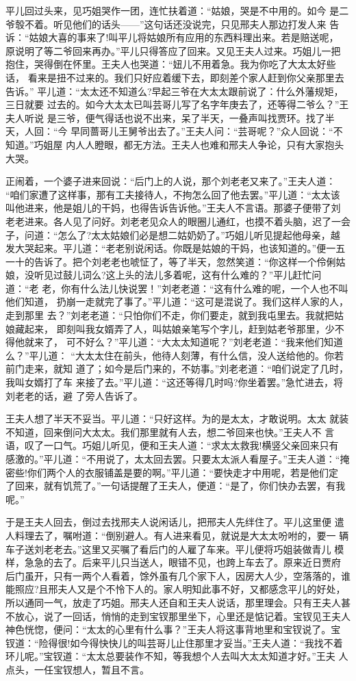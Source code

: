 平儿回过头来，见巧姐哭作一团，连忙扶着道：“姑娘，哭是不中用的。如今
是二爷彀不着。听见他们的话头——”这句话还没说完，只见邢夫人那边打发人来
告诉：“姑娘大喜的事来了!叫平儿将姑娘所有应用的东西料理出来。若是赔送呢，
原说明了等二爷回来再办。”平儿只得答应了回来。又见王夫人过来。巧姐儿一把
抱住，哭得倒在怀里。王夫人也哭道：“妞儿不用着急。我为你吃了大太太好些话，
看来是扭不过来的。我们只好应着缓下去，即刻差个家人赶到你父亲那里去告诉。”
平儿道：“太太还不知道么?早起三爷在大太太跟前说了：什么外藩规矩，三日就要
过去的。如今大太太已叫芸哥儿写了名字年庚去了，还等得二爷么？”王夫人听说
是三爷，便气得话也说不出来，呆了半天，一叠声叫找贾环。找了半天，人回：“今
早同蔷哥儿王舅爷出去了。”王夫人问：“芸哥呢？”众人回说：“不知道。”巧姐屋
内人人瞪眼，都无方法。王夫人也难和邢夫人争论，只有大家抱头大哭。

正闹着，一个婆子进来回说：“后门上的人说，那个刘老老又来了。”王夫人道：
“咱们家遭了这样事，那有工夫接待人，不拘怎么回了他去罢。”平儿道：“太太该
叫他进来，他是姐儿的干妈，也得告诉告诉他。”王夫人不言语。那婆子便带了刘
老老进来。各人见了问好。刘老老见众人的眼圈儿通红，也摸不着头脑，迟了一会
子，问道：“怎么了?太太姑娘们必是想二姑奶奶了。”巧姐儿听见提起他母亲，越
发大哭起来。平儿道：“老老别说闲话。你既是姑娘的干妈，也该知道的。”便一五
一十的告诉了。把个刘老老也唬怔了，等了半天，忽然笑道：“你这样一个伶俐姑
娘，没听见过鼓儿词么?这上头的法儿多着呢，这有什么难的？”平儿赶忙问道：“老
老，你有什么法儿快说罢！”刘老老道：“这有什么难的呢，一个人也不叫他们知道，
扔崩一走就完了事了。”平儿道：“这可是混说了。我们这样人家的人，走到那里
去？”刘老老道：“只怕你们不走，你们要走，就到我屯里去。我就把姑娘藏起来，
即刻叫我女婿弄了人，叫姑娘亲笔写个字儿，赶到姑老爷那里，少不得他就来了，
可不好么？”平儿道：“大太太知道呢？”刘老老道：“我来他们知道么？”平儿道：
“大太太住在前头，他待人刻薄，有什么信，没人送给他的。你若前门走来，就知
道了；如今是后门来的，不妨事。”刘老老道：“咱们说定了几时，我叫女婿打了车
来接了去。”平儿道：“这还等得几时吗?你坐着罢。”急忙进去，将刘老老的话，避
了旁人告诉了。

王夫人想了半天不妥当。平儿道：“只好这样。为的是太太，才敢说明。太太
就装不知道，回来倒问大太太。我们那里就有人去，想二爷回来也快。”王夫人不
言语，叹了一口气。巧姐儿听见，便和王夫人道：“求太太救我!横竖父亲回来只有
感激的。”平儿道：“不用说了，太太回去罢。只要太太派人看屋子。”王夫人道：“掩
密些!你们两个人的衣服铺盖是要的啊。”平儿道：“要快走才中用呢，若是他们定
了回来，就有饥荒了。”一句话提醒了王夫人，便道：“是了，你们快办去罢，有我
呢。”

于是王夫人回去，倒过去找邢夫人说闲话儿，把邢夫人先绊住了。平儿这里便
遣人料理去了，嘱咐道：“倒别避人。有人进来看见，就说是大太太吩咐的，要一
辆车子送刘老老去。”这里又买嘱了看后门的人雇了车来。平儿便将巧姐装做青儿
模样，急急的去了。后来平儿只当送人，眼错不见，也跨上车去了。原来近日贾府
后门虽开，只有一两个人看着，馀外虽有几个家下人，因房大人少，空落落的，谁
能照应?且邢夫人又是个不怜下人的。家人明知此事不好，又都感念平儿的好处，
所以通同一气，放走了巧姐。邢夫人还自和王夫人说话，那里理会。只有王夫人甚
不放心，说了一回话，悄悄的走到宝钗那里坐下，心里还是惦记着。宝钗见王夫人
神色恍惚，便问：“太太的心里有什么事？”王夫人将这事背地里和宝钗说了。宝
钗道：“险得很!如今得快快儿的叫芸哥儿止住那里才妥当。”王夫人道：“我找不着
环儿呢。”宝钗道：“太太总要装作不知，等我想个人去叫大太太知道才好。”王夫
人点头，一任宝钗想人，暂且不言。

